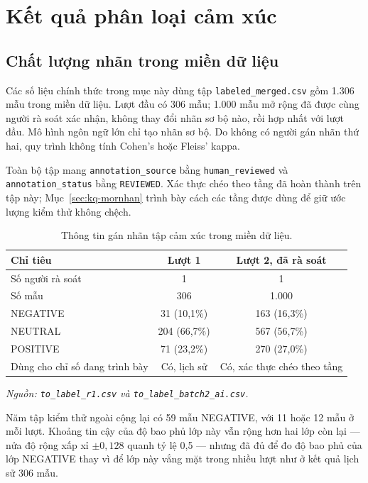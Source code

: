 \section{Kết quả phân loại cảm xúc}
\label{sec:kq-sentiment}

\subsection{Chất lượng nhãn trong miền dữ liệu}

Các số liệu chính thức trong mục này dùng tập \texttt{labeled\_merged.csv} gồm 1.306
mẫu trong miền dữ liệu. Lượt đầu có 306 mẫu; 1.000 mẫu mở rộng đã được cùng người rà
soát xác nhận, không thay đổi nhãn sơ bộ nào, rồi hợp nhất với lượt đầu. Mô hình ngôn
ngữ lớn chỉ tạo nhãn sơ bộ. Do không có người gán nhãn thứ hai, quy trình không tính
Cohen's hoặc Fleiss' kappa.

Toàn bộ tập mang \texttt{annotation\_source} bằng \texttt{human\_reviewed} và
\texttt{annotation\_status} bằng \texttt{REVIEWED}. Xác thực chéo theo tầng đã hoàn
thành trên tập này; Mục~\ref{sec:kq-mornhan} trình bày cách các tầng được dùng để giữ
ước lượng kiểm thử không chệch.

\begin{table}[H]
  \centering
  \caption{Thông tin gán nhãn tập cảm xúc trong miền dữ liệu.}
  \label{tab:kq-annotation}
  \begin{tabular}{p{7.6cm} c c}
    \toprule
    Chỉ tiêu & Lượt 1 & Lượt 2, đã rà soát \\
    \midrule
    Số người rà soát & 1 & 1 \\
    Số mẫu & 306 & 1.000 \\
    NEGATIVE & 31 (10,1\%) & 163 (16,3\%) \\
    NEUTRAL & 204 (66,7\%) & 567 (56,7\%) \\
    POSITIVE & 71 (23,2\%) & 270 (27,0\%) \\
    Dùng cho chỉ số đang trình bày & Có, lịch sử & Có, xác thực chéo theo tầng \\
    \bottomrule
  \end{tabular}
\noindent\textit{Nguồn: \texttt{to\_label\_r1.csv} và \texttt{to\_label\_batch2\_ai.csv}.}
\end{table}

Năm tập kiểm thử ngoài cộng lại có 59 mẫu NEGATIVE, với 11 hoặc 12 mẫu ở mỗi lượt.
Khoảng tin cậy của độ bao phủ lớp này vẫn rộng hơn hai lớp còn lại --- nửa độ rộng
xấp xỉ $\pm0{,}128$ quanh tỷ lệ 0,5 --- nhưng đã đủ để đo độ bao phủ của lớp
NEGATIVE thay vì để lớp này vắng mặt trong nhiều lượt như ở kết quả lịch sử 306 mẫu.

